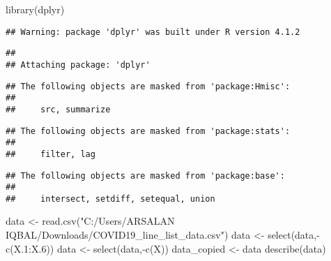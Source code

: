\documentclass[
]{article}
\newenvironment{Shaded}{\begin{snugshade}}{\end{snugshade}}
\newcommand{\FloatTok}[1]{\textcolor[rgb]{0.00,0.00,0.81}{#1}}
\newcommand{\FunctionTok}[1]{\textcolor[rgb]{0.00,0.00,0.00}{#1}}
\newcommand{\NormalTok}[1]{#1}
\newcommand{\OtherTok}[1]{\textcolor[rgb]{0.56,0.35,0.01}{#1}}
\newcommand{\SpecialCharTok}[1]{\textcolor[rgb]{0.00,0.00,0.00}{#1}}
\newcommand{\StringTok}[1]{\textcolor[rgb]{0.31,0.60,0.02}{#1}}
\begin{document}
\begin{Shaded}
\begin{Highlighting}[]
\FunctionTok{library}\NormalTok{(dplyr)}
\end{Highlighting}
\end{Shaded}

\begin{verbatim}
## Warning: package 'dplyr' was built under R version 4.1.2
\end{verbatim}

\begin{verbatim}
## 
## Attaching package: 'dplyr'
\end{verbatim}

\begin{verbatim}
## The following objects are masked from 'package:Hmisc':
## 
##     src, summarize
\end{verbatim}

\begin{verbatim}
## The following objects are masked from 'package:stats':
## 
##     filter, lag
\end{verbatim}

\begin{verbatim}
## The following objects are masked from 'package:base':
## 
##     intersect, setdiff, setequal, union
\end{verbatim}

\begin{Shaded}
\begin{Highlighting}[]
\NormalTok{data }\OtherTok{\textless{}{-}} \FunctionTok{read.csv}\NormalTok{(}\StringTok{"C:/Users/ARSALAN IQBAL/Downloads/COVID19\_line\_list\_data.csv"}\NormalTok{)}
\NormalTok{data }\OtherTok{\textless{}{-}} \FunctionTok{select}\NormalTok{(data,}\SpecialCharTok{{-}}\FunctionTok{c}\NormalTok{(X}\FloatTok{.1}\SpecialCharTok{:}\NormalTok{X}\FloatTok{.6}\NormalTok{))}
\NormalTok{data }\OtherTok{\textless{}{-}} \FunctionTok{select}\NormalTok{(data,}\SpecialCharTok{{-}}\FunctionTok{c}\NormalTok{(X))}
\NormalTok{data\_copied }\OtherTok{\textless{}{-}}\NormalTok{ data}
\FunctionTok{describe}\NormalTok{(data)}
\end{Highlighting}
\end{Shaded}
\end{document}
